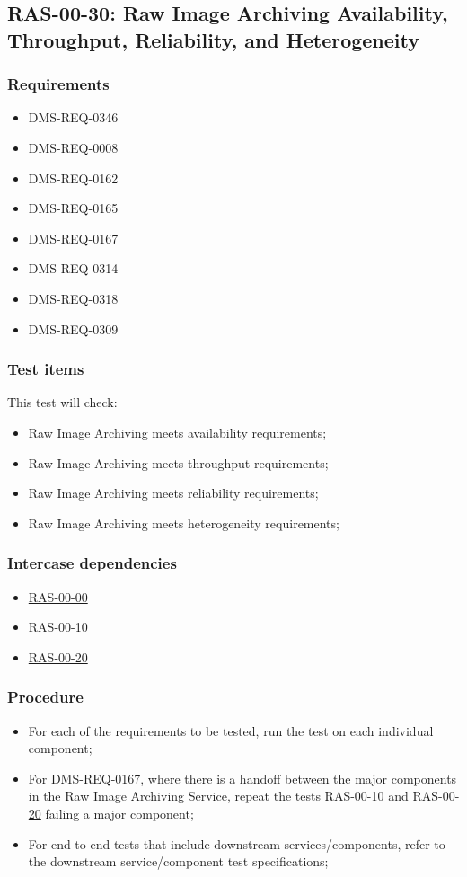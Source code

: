 \documentclass[DM,lsstdraft,STS,toc]{lsstdoc}
\begin{document}
\subsection{RAS-00-30: Raw Image Archiving Availability, Throughput, Reliability, and Heterogeneity}
\label{ras-00-30}

\subsubsection{Requirements}
\begin{itemize}
\item{DMS-REQ-0346}
\item{DMS-REQ-0008}
\item{DMS-REQ-0162}
\item{DMS-REQ-0165}
\item{DMS-REQ-0167}
\item{DMS-REQ-0314}
\item{DMS-REQ-0318}
\item{DMS-REQ-0309}
\end{itemize}

\subsubsection{Test items}


This test will check:
\begin{itemize}
\item{Raw Image Archiving meets availability requirements;}
\item{Raw Image Archiving meets throughput requirements;}
\item{Raw Image Archiving meets reliability requirements;}
\item{Raw Image Archiving meets heterogeneity requirements;}
\end{itemize}

\subsubsection{Intercase dependencies}
\begin{itemize}
\item{\hyperref[ras-00-00]{RAS-00-00}}
\item{\hyperref[ras-00-00]{RAS-00-10}}
\item{\hyperref[ras-00-00]{RAS-00-20}}
\end{itemize}

\subsubsection{Procedure}
\begin{itemize}
\item{For each of the requirements to be tested, run the test on each individual component;}
\item{For DMS-REQ-0167, where there is a handoff between the major components in the Raw Image Archiving Service,
repeat the tests \hyperref[ras-00-00]{RAS-00-10} and \hyperref[ras-00-00]{RAS-00-20} failing a major component;}
\item{For end-to-end tests that include downstream services/components, refer to the downstream
service/component test specifications;}
\end{itemize}
\end{document}
